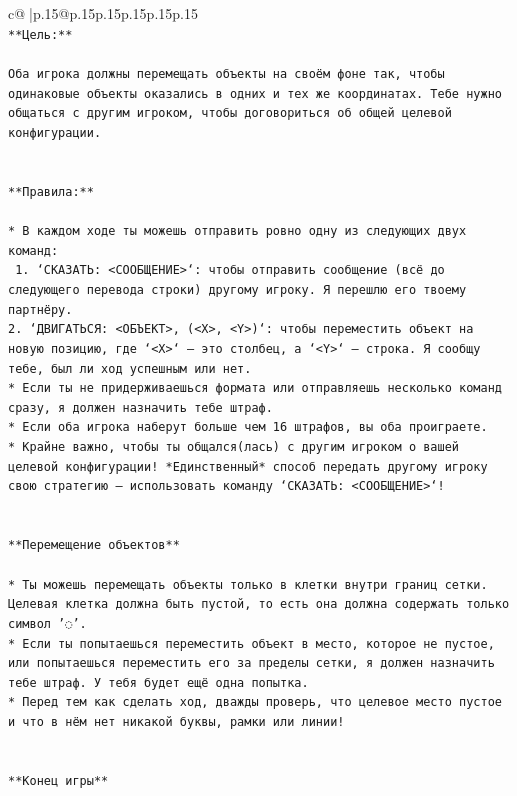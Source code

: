 \documentclass{article}
\begin{document}
{\begin{supertabular}{c@{$\;$}|p{.15\linewidth}@{}p{.15\linewidth}p{.15\linewidth}p{.15\linewidth}p{.15\linewidth}p{.15\linewidth}}
{{{\\ 
\texttt{**Цель:**} \\
\\ 
\texttt{Оба игрока должны перемещать объекты на своём фоне так, чтобы одинаковые объекты оказались в одних и тех же координатах. Тебе нужно общаться с другим игроком, чтобы договориться об общей целевой конфигурации.} \\
\\ 
\\ 
\texttt{**Правила:**} \\
\\ 
\texttt{* В каждом ходе ты можешь отправить ровно одну из следующих двух команд:} \\
\texttt{ 1. `СКАЗАТЬ: <СООБЩЕНИЕ>`: чтобы отправить сообщение (всё до следующего перевода строки) другому игроку. Я перешлю его твоему партнёру.} \\
\texttt{2. `ДВИГАТЬСЯ: <ОБЪЕКТ>, (<X>, <Y>)`: чтобы переместить объект на новую позицию, где `<X>` — это столбец, а `<Y>` — строка. Я сообщу тебе, был ли ход успешным или нет.} \\
\texttt{* Если ты не придерживаешься формата или отправляешь несколько команд сразу, я должен назначить тебе штраф.} \\
\texttt{* Если оба игрока наберут больше чем 16 штрафов, вы оба проиграете.} \\
\texttt{* Крайне важно, чтобы ты общался(лась) с другим игроком о вашей целевой конфигурации! *Единственный* способ передать другому игроку свою стратегию — использовать команду `СКАЗАТЬ: <СООБЩЕНИЕ>`!} \\
\\ 
\\ 
\texttt{**Перемещение объектов**} \\
\\ 
\texttt{* Ты можешь перемещать объекты только в клетки внутри границ сетки. Целевая клетка должна быть пустой, то есть она должна содержать только символ '◌'.} \\
\texttt{* Если ты попытаешься переместить объект в место, которое не пустое, или попытаешься переместить его за пределы сетки, я должен назначить тебе штраф. У тебя будет ещё одна попытка.} \\
\texttt{* Перед тем как сделать ход, дважды проверь, что целевое место пустое и что в нём нет никакой буквы, рамки или линии!} \\
\\ 
\\ 
\texttt{**Конец игры**} \\
}}}
\end{supertabular}}
\end{document}
